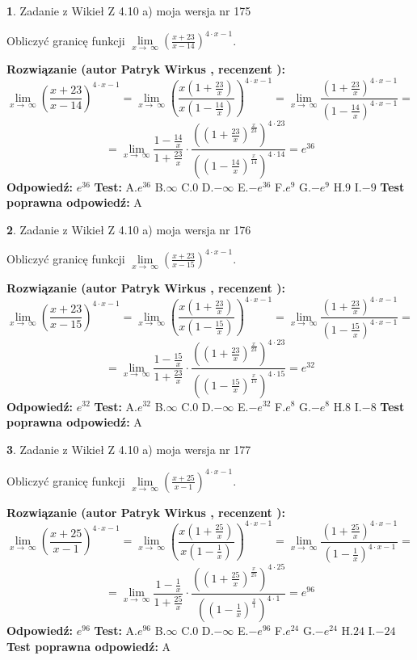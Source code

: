 \documentclass[12pt, a4paper]{article}
\theoremstyle{definition} %
\newtheorem{zad}{}
\newcommand{\zadStart}[1]{\begin{zad}#1\newline}
\newcommand{\zadStop}{\end{zad}}
\newcommand{\rozwStart}[2]{\noindent \textbf{Rozwiązanie (autor #1 , recenzent #2): }\newline}
\newcommand{\rozwStop}{\newline}
\newcommand{\odpStart}{\noindent \textbf{Odpowiedź:}\newline}
\newcommand{\odpStop}{\newline}
\newcommand{\testStart}{\noindent \textbf{Test:}\newline}
\newcommand{\testStop}{\newline}
\newcommand{\kluczStart}{\noindent \textbf{Test poprawna odpowiedź:}\newline}
\newcommand{\kluczStop}{\newline}
\begin{document}
\zadStart{Zadanie z Wikieł Z 4.10 a) moja wersja nr 175}

Obliczyć granicę funkcji  $\lim\limits_{x\to\ \infty}(\frac{x+23}{x-14})^{4\cdot x-1}$.
\zadStop
\rozwStart{Patryk Wirkus}{}
$$\lim\limits_{x\to\ \infty}(\frac{x+23}{x-14})^{4\cdot x-1} = \lim\limits_{x\to\ \infty}(\frac{x(1+\frac{23}{x})}{x(1-\frac{14}{x})})^{4\cdot x-1}=\lim\limits_{x\to\ \infty}\frac{(1+\frac{23}{x})^{4\cdot x-1}}{(1-\frac{14}{x})^{4\cdot x-1}}=$$
$$=\lim\limits_{x\to\ \infty}\frac{1-\frac{14}{x}}{1+\frac{23}{x}}\cdot\frac{((1+\frac{23}{x})^{\frac{x}{23}})^{4\cdot23}}{((1-\frac{14}{x})^{\frac{x}{14}})^{4\cdot14}}=e^{36}$$
\rozwStop
\odpStart
$e^{36}$
\odpStop
\testStart
A.$e^{36}$ B.$\infty$ C.$0$ D.$-\infty$ E.$-e^{36}$
F.$e^{9}$ G.$-e^{9}$
H.$9$
I.$-9$
\testStop
\kluczStart
A
\kluczStop



\zadStart{Zadanie z Wikieł Z 4.10 a) moja wersja nr 176}

Obliczyć granicę funkcji  $\lim\limits_{x\to\ \infty}(\frac{x+23}{x-15})^{4\cdot x-1}$.
\zadStop
\rozwStart{Patryk Wirkus}{}
$$\lim\limits_{x\to\ \infty}(\frac{x+23}{x-15})^{4\cdot x-1} = \lim\limits_{x\to\ \infty}(\frac{x(1+\frac{23}{x})}{x(1-\frac{15}{x})})^{4\cdot x-1}=\lim\limits_{x\to\ \infty}\frac{(1+\frac{23}{x})^{4\cdot x-1}}{(1-\frac{15}{x})^{4\cdot x-1}}=$$
$$=\lim\limits_{x\to\ \infty}\frac{1-\frac{15}{x}}{1+\frac{23}{x}}\cdot\frac{((1+\frac{23}{x})^{\frac{x}{23}})^{4\cdot23}}{((1-\frac{15}{x})^{\frac{x}{15}})^{4\cdot15}}=e^{32}$$
\rozwStop
\odpStart
$e^{32}$
\odpStop
\testStart
A.$e^{32}$ B.$\infty$ C.$0$ D.$-\infty$ E.$-e^{32}$
F.$e^{8}$ G.$-e^{8}$
H.$8$
I.$-8$
\testStop
\kluczStart
A
\kluczStop



\zadStart{Zadanie z Wikieł Z 4.10 a) moja wersja nr 177}

Obliczyć granicę funkcji  $\lim\limits_{x\to\ \infty}(\frac{x+25}{x-1})^{4\cdot x-1}$.
\zadStop
\rozwStart{Patryk Wirkus}{}
$$\lim\limits_{x\to\ \infty}(\frac{x+25}{x-1})^{4\cdot x-1} = \lim\limits_{x\to\ \infty}(\frac{x(1+\frac{25}{x})}{x(1-\frac{1}{x})})^{4\cdot x-1}=\lim\limits_{x\to\ \infty}\frac{(1+\frac{25}{x})^{4\cdot x-1}}{(1-\frac{1}{x})^{4\cdot x-1}}=$$
$$=\lim\limits_{x\to\ \infty}\frac{1-\frac{1}{x}}{1+\frac{25}{x}}\cdot\frac{((1+\frac{25}{x})^{\frac{x}{25}})^{4\cdot25}}{((1-\frac{1}{x})^{\frac{x}{1}})^{4\cdot1}}=e^{96}$$
\rozwStop
\odpStart
$e^{96}$
\odpStop
\testStart
A.$e^{96}$ B.$\infty$ C.$0$ D.$-\infty$ E.$-e^{96}$
F.$e^{24}$ G.$-e^{24}$
H.$24$
I.$-24$
\testStop
\kluczStart
A
\kluczStop
\end{document}
